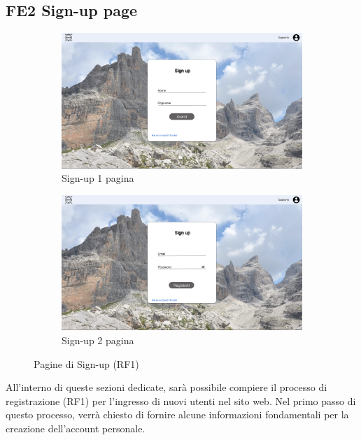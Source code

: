 \documentclass[a4paper,12pt]{article}
\begin{document}
\subsection*{FE2 Sign-up page}
\begin{figure}[H]
  \begin{subfigure}{0.49\textwidth}
    \centering
    \includegraphics[width=\textwidth]{img/Sign-up 1.png} 
    \caption{Sign-up 1 pagina}
  \end{subfigure}
  \hfill %
  \begin{subfigure}{0.49\textwidth}
    \centering
    \includegraphics[width=\textwidth]{img/Sign-up 2.png} 
    \caption{Sign-up 2 pagina}
  \end{subfigure}
  \caption{Pagine di Sign-up (RF1)}
\end{figure}
All'interno di queste sezioni dedicate, sarà possibile compiere il processo di registrazione (RF1) per l'ingresso di nuovi utenti nel sito web. Nel primo passo di questo processo, verrà chiesto di fornire alcune informazioni fondamentali per la creazione dell'account personale.
\end{document}
